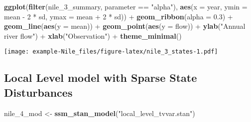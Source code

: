\documentclass[]{book}
\newenvironment{Shaded}{\begin{snugshade}}{\end{snugshade}}
\newcommand{\KeywordTok}[1]{\textcolor[rgb]{0.13,0.29,0.53}{\textbf{{#1}}}}
\newcommand{\DataTypeTok}[1]{\textcolor[rgb]{0.13,0.29,0.53}{{#1}}}
\newcommand{\DecValTok}[1]{\textcolor[rgb]{0.00,0.00,0.81}{{#1}}}
\newcommand{\FloatTok}[1]{\textcolor[rgb]{0.00,0.00,0.81}{{#1}}}
\newcommand{\StringTok}[1]{\textcolor[rgb]{0.31,0.60,0.02}{{#1}}}
\newcommand{\NormalTok}[1]{{#1}}
\begin{document}
\begin{Shaded}
\begin{Highlighting}[]
\KeywordTok{ggplot}\NormalTok{(}\KeywordTok{filter}\NormalTok{(nile_3_summary, parameter ==}\StringTok{ "alpha"}\NormalTok{),}
       \KeywordTok{aes}\NormalTok{(}\DataTypeTok{x =} \NormalTok{year,}
           \DataTypeTok{ymin =} \NormalTok{mean -}\StringTok{ }\DecValTok{2} \NormalTok{*}\StringTok{ }\NormalTok{sd,}
           \DataTypeTok{ymax =} \NormalTok{mean +}\StringTok{ }\DecValTok{2} \NormalTok{*}\StringTok{ }\NormalTok{sd)) +}
\StringTok{  }\KeywordTok{geom_ribbon}\NormalTok{(}\DataTypeTok{alpha =} \FloatTok{0.3}\NormalTok{) +}
\StringTok{  }\KeywordTok{geom_line}\NormalTok{(}\KeywordTok{aes}\NormalTok{(}\DataTypeTok{y =} \NormalTok{mean)) +}
\StringTok{  }\KeywordTok{geom_point}\NormalTok{(}\KeywordTok{aes}\NormalTok{(}\DataTypeTok{y =} \NormalTok{flow)) +}
\StringTok{  }\KeywordTok{ylab}\NormalTok{(}\StringTok{"Annual river flow"}\NormalTok{) +}
\StringTok{  }\KeywordTok{xlab}\NormalTok{(}\StringTok{"Observation"}\NormalTok{) +}
\StringTok{  }\KeywordTok{theme_minimal}\NormalTok{()}
\end{Highlighting}
\end{Shaded}

\texttt{[image: example-Nile\_files/figure-latex/nile\_3\_states-1.pdf]}

\subsection{Local Level model with Sparse State
Disturbances}\label{local-level-model-with-sparse-state-disturbances}

\begin{Shaded}
\begin{Highlighting}[]
\NormalTok{nile_4_mod <-}\StringTok{ }\KeywordTok{ssm_stan_model}\NormalTok{(}\StringTok{"local_level_tvvar.stan"}\NormalTok{)}
\end{Highlighting}
\end{Shaded}
\end{document}
